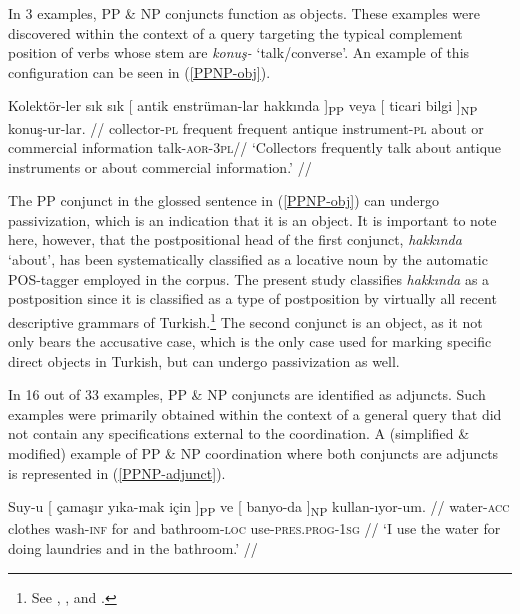 In 3 examples, PP \& NP conjuncts function as objects. These examples were discovered within the context of a query targeting the typical complement position of verbs whose stem are \textit{konuş-} `talk/converse'. An example of this configuration can be seen in (\ref{PPNP-obj}). 

\pex[glspace=!1em,everygla={},everyglb={},aboveglbskip=-.15ex, interpartskip=15pt]
\label{PPNP-obj} \begingl
\gla Kolektör-ler sık sık {[} antik enstrüman-lar {hakkında ]\textsubscript{PP}} veya {[} ticari {bilgi ]\textsubscript{NP}} konuş-ur-lar. //
\glb collector-\textsc{pl}  frequent frequent antique instrument-\textsc{pl} about or commercial information talk-\textsc{aor}-\textsc{3pl}//
\glft `Collectors frequently talk about antique instruments or about commercial information.' //
\endgl
\xe

The PP conjunct in the glossed sentence in (\ref{PPNP-obj}) can undergo passivization, which is an indication that it is an object. It is important to note here, however, that the postpositional head of the first conjunct, \textit{hakkında} `about', has been systematically classified as a locative noun by the automatic POS-tagger employed in the corpus. The present study classifies \textit{hakkında} as a postposition since it is classified as a type of postposition by virtually all recent descriptive grammars of Turkish.\footnote{See \citet[pp.\ 100--102]{kornfilt97}, \citet[pp.\ 225--226]{asli_kerslake_2005}, and \citet[p.\ 107]{asli_kerslake_2010}.} The second conjunct is an object, as it not only bears the accusative case, which is the only case used for marking specific direct objects in Turkish, but can undergo passivization as well. 

In 16 out of 33 examples, PP \& NP conjuncts are identified as adjuncts. Such examples were primarily obtained within the context of a general query that did not contain any specifications external to the coordination. A (simplified \& modified) example of PP \& NP coordination where both conjuncts are adjuncts is represented in (\ref{PPNP-adjunct}).

\pex[glspace=!1em,everygla={},everyglb={},aboveglbskip=-.15ex, interpartskip=15pt]
\label{PPNP-adjunct} \begingl
\gla Suy-u {[} çamaşır yıka-mak {için ]\textsubscript{PP}} ve {[} {banyo-da ]\textsubscript{NP}} kullan-ıyor-um. //
\glb water-\textsc{acc} clothes wash-\textsc{inf} for and bathroom-\textsc{loc} use-\textsc{pres.prog}-\textsc{1sg}  //
\glft `I use the water for doing laundries and in the bathroom.' //
\endgl
\xe

